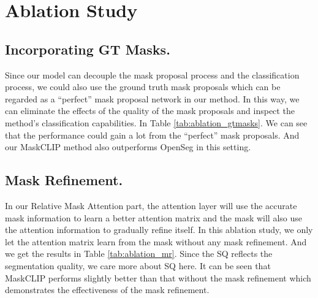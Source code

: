 \documentclass{article}
\theoremstyle{plain}
\theoremstyle{definition}
\theoremstyle{remark}
\begin{document}
\section{Ablation Study} 

\subsection{Incorporating GT Masks.}

Since our model can decouple the mask proposal process and the classification process, we could also use the ground truth mask proposals which can be regarded as a ``perfect'' mask proposal network in our method. In this way, we can eliminate the effects of the quality of the mask proposals and inspect the method's classification capabilities.  In Table \ref{tab:ablation_gtmasks}. We can see that the performance could gain a lot from the ``perfect'' mask proposals. And our MaskCLIP method also outperforms OpenSeg in this setting.


\begin{table}[H]
\centering
\caption{\textbf{Incorporating GT Masks.} Results on using GT masks as mask proposals for open-vocabulary panoptic segmentation and semantic segmentation.}
\label{tab:ablation_gtmasks}
\end{table}

\subsection{Mask Refinement.}

In our Relative Mask Attention part, the attention layer will use the accurate mask information to learn a better attention matrix and the mask will also use the attention information to gradually refine itself. In this ablation study, we only let the attention matrix learn from the mask without any mask refinement. And we get the results in Table \ref{tab:ablation_mr}. Since the SQ reflects the segmentation quality, we care more about SQ here. It can be seen that MaskCLIP performs slightly better than that without the mask refinement which demonstrates the effectiveness of the mask refinement.
\end{document}

